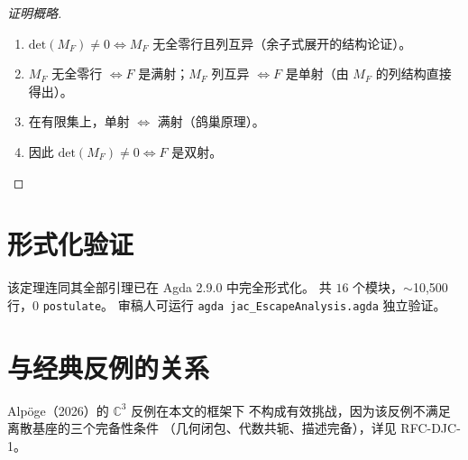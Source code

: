 \documentclass[a4paper,11pt]{article}
\newcommand{\MF}{M_F}
\newcommand{\Det}{\mathrm{det}}
\begin{document}
\begin{proof}[证明概略]
\begin{enumerate}
\item $\Det(\MF) \neq 0 \iff \MF$ 无全零行且列互异（余子式展开的结构论证）。
\item $\MF$ 无全零行 $\iff F$ 是满射；$\MF$ 列互异 $\iff F$ 是单射（由 $\MF$ 的列结构直接得出）。
\item 在有限集上，单射 $\iff$ 满射（鸽巢原理）。
\item 因此 $\Det(\MF) \neq 0 \iff F$ 是双射。
\end{enumerate}
\end{proof}

\section{形式化验证}

该定理连同其全部引理已在 Agda 2.9.0 中完全形式化。
共 $16$ 个模块，$\sim$10,500 行，$0$ \texttt{postulate}。
审稿人可运行 \texttt{agda jac\_EscapeAnalysis.agda} 独立验证。

\section{与经典反例的关系}

Alp\"{o}ge（2026）的 $\mathbb{C}^3$ 反例在本文的框架下
不构成有效挑战，因为该反例不满足离散基座的三个完备性条件
（几何闭包、代数共轭、描述完备），详见 RFC-DJC-1。
\end{document}
